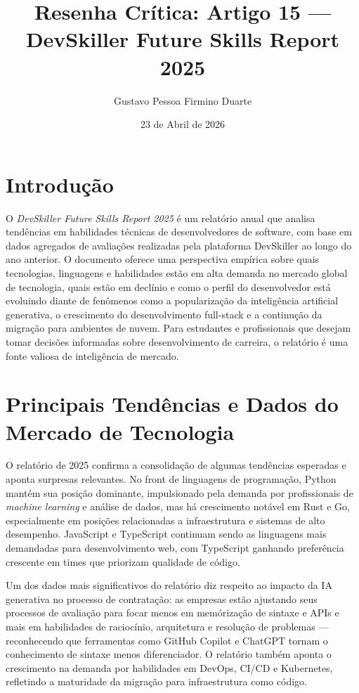 \documentclass[12pt,a4paper]{article}
\title{Resenha Cr\'itica: Artigo 15 ---\\
DevSkiller Future Skills Report 2025}
\author{Gustavo Pessoa Firmino Duarte}
\date{23 de Abril de 2026}
\begin{document}
\maketitle

\section{Introdu\c{c}\~ao}

O \textit{DevSkiller Future Skills Report 2025} \'e um relat\'orio anual que analisa
tend\^encias em habilidades t\'ecnicas de desenvolvedores de software, com base
em dados agregados de avalia\c{c}\~oes realizadas pela plataforma DevSkiller ao
longo do ano anterior. O documento oferece uma perspectiva emp\'irica sobre quais
tecnologias, linguagens e habilidades est\~ao em alta demanda no mercado global
de tecnologia, quais est\~ao em declínio e como o perfil do desenvolvedor est\'a
evoluindo diante de fen\^omenos como a populariza\c{c}\~ao da intelig\^encia
artificial generativa, o crescimento do desenvolvimento full-stack e a continu\c{c}\~ao
da migra\c{c}\~ao para ambientes de nuvem. Para estudantes e profissionais que
desejam tomar decis\~oes informadas sobre desenvolvimento de carreira, o relat\'orio
\'e uma fonte valiosa de intelig\^encia de mercado.

\section{Principais Tend\^encias e Dados do Mercado de Tecnologia}

O relat\'orio de 2025 confirma a consolida\c{c}\~ao de algumas tend\^encias
esperadas e aponta surpresas relevantes. No front de linguagens de programa\c{c}\~ao,
Python mant\'em sua posi\c{c}\~ao dominante, impulsionado pela demanda por
profissionais de \textit{machine learning} e an\'alise de dados, mas h\'a crescimento
not\'avel em Rust e Go, especialmente em posi\c{c}\~oes relacionadas a infraestrutura
e sistemas de alto desempenho. JavaScript e TypeScript continuam sendo as linguagens
mais demandadas para desenvolvimento web, com TypeScript ganhando prefer\^encia
crescente em times que priorizam qualidade de c\'odigo.

Um dos dados mais significativos do relat\'orio diz respeito ao impacto da IA
generativa no processo de contrata\c{c}\~ao: as empresas est\~ao ajustando seus
processos de avalia\c{c}\~ao para focar menos em mem\'oriza\c{c}\~ao de sintaxe
e APIs e mais em habilidades de racioc\'inio, arquitetura e resolu\c{c}\~ao de
problemas --- reconhecendo que ferramentas como GitHub Copilot e ChatGPT tornam
o conhecimento de sintaxe menos diferenciador. O relat\'orio tamb\'em aponta o
crescimento na demanda por habilidades em DevOps, CI/CD e Kubernetes, refletindo
a maturidade da migra\c{c}\~ao para infraestrutura como c\'odigo.
\end{document}
